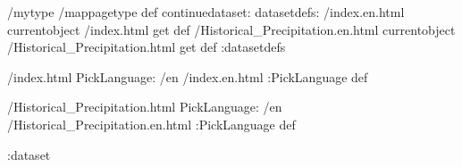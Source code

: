 \begin{ingrid}
/mytype /mappagetype def
continuedataset:
datasetdefs:
/index.en.html currentobject /index.html get def
/Historical_Precipitation.en.html currentobject /Historical_Precipitation.html get def
:datasetdefs

/index.html {
PickLanguage:
/en /index.en.html
:PickLanguage
} def

/Historical_Precipitation.html {
PickLanguage:
/en /Historical_Precipitation.en.html
:PickLanguage
} def

:dataset
\end{ingrid}
